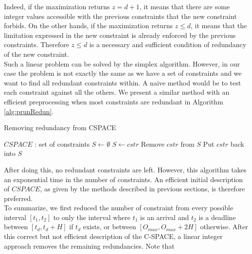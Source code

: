 \documentclass[times, 10pt,twocolumn, a4paper]{article}
\begin{document}
Indeed, if the maximization returns $z=d+1$, it means that there are some integer values accessible with the previous constraints that the new constraint forbids. On the other hands, if the maximization returns $z \leq d$, it means that the limitation expressed in the new constraint is already enforced by the previous constraints. Therefore $z \leq d$ is a necessary and sufficient condition of redundancy of the new constraint.\\

Such a linear problem can be solved by the simplex algorithm. However, in our case the problem is not exactly the same as we have a set of constraints and we want to find all redundant constraints within. A naive method would be to test each constraint against all the others. We present a similar method with an efficient preprocessing when most constraints are redundant in Algorithm \ref{alg:prunRedun}.\\

\begin{algorithm}
\caption{Removing redundancy from CSPACE}
\label{alg:prunRedun}
	\begin{algorithmic}[1]
		\STATE $CSPACE$ : set of constraints
		\STATE $S \leftarrow \emptyset$
		\STATE {}
				\STATE $S \leftarrow cstr$
			\ENDIF
		\ENDFOR
		\STATE {}
			\STATE Remove $cstr$ from $S$
				\STATE Put $cstr$ back into $S$
			\ENDIF
		\ENDFOR
	\end{algorithmic}
\end{algorithm}

After doing this, no redundant constraints are left. However, this algorithm takes an exponential time in the number of constraints. An efficient initial description of $CSPACE$, as given by the methods described in previous sections, is therefore preferred.\\

To summarize, we first reduced the number of constraint from every possible interval $[t_1, t_2]$ to only the interval where $t_1$ is an arrival and $t_2$ is a deadline between $[t_d, t_d + H]$ if $t_d$ exists, or between $[O_{max}, O_{max} + 2H]$ otherwise. After this correct but not efficient description of the C-SPACE, a linear integer approach removes the remaining redundancies. Note that
\end{document}
